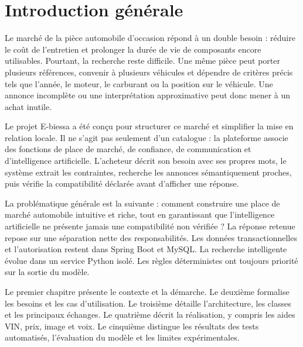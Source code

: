 \chapter*{Introduction générale}

Le marché de la pièce automobile d'occasion répond à un double besoin : réduire le coût de l'entretien et prolonger la durée de vie de composants encore utilisables. Pourtant, la recherche reste difficile. Une même pièce peut porter plusieurs références, convenir à plusieurs véhicules et dépendre de critères précis tels que l'année, le moteur, le carburant ou la position sur le véhicule. Une annonce incomplète ou une interprétation approximative peut donc mener à un achat inutile.


Le projet E-biessa a été conçu pour structurer ce marché et simplifier la mise en relation locale. Il ne s'agit pas seulement d'un catalogue : la plateforme associe des fonctions de place de marché, de confiance, de communication et d'intelligence artificielle. L'acheteur décrit son besoin avec ses propres mots, le système extrait les contraintes, recherche les annonces sémantiquement proches, puis vérifie la compatibilité déclarée avant d'afficher une réponse.


La problématique générale est la suivante : comment construire une place de marché automobile intuitive et riche, tout en garantissant que l'intelligence artificielle ne présente jamais une compatibilité non vérifiée ? La réponse retenue repose sur une séparation nette des responsabilités. Les données transactionnelles et l'autorisation restent dans Spring Boot et MySQL. La recherche intelligente évolue dans un service Python isolé. Les règles déterministes ont toujours priorité sur la sortie du modèle.


Le premier chapitre présente le contexte et la démarche. Le deuxième formalise les besoins et les cas d'utilisation. Le troisième détaille l'architecture, les classes et les principaux échanges. Le quatrième décrit la réalisation, y compris les aides VIN, prix, image et voix. Le cinquième distingue les résultats des tests automatisés, l'évaluation du modèle et les limites expérimentales.
